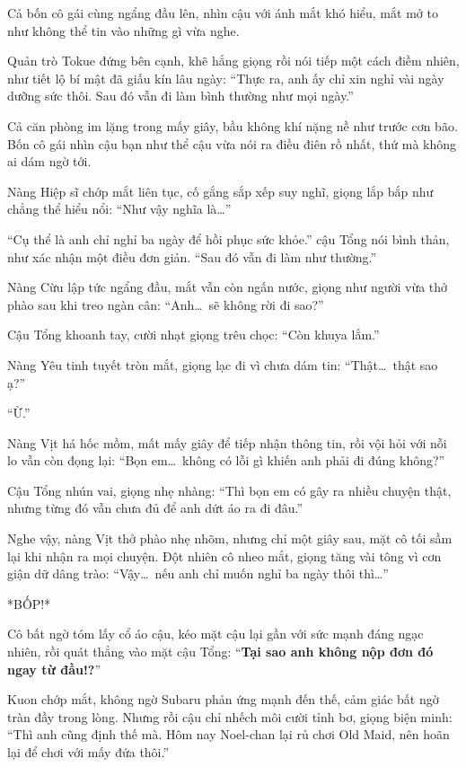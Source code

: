 \documentclass[../main.tex]{subfiles}
\begin{document}
Cả bốn cô gái cùng ngẩng đầu lên, nhìn cậu với ánh mắt khó hiểu, mắt mở to như không thể tin vào những gì vừa nghe.

Quản trò Tokue đứng bên cạnh, khẽ hắng giọng rồi nói tiếp một cách điềm nhiên, như tiết lộ bí mật đã giấu kín lâu ngày: ``Thực ra, anh ấy chỉ xin nghỉ vài ngày dưỡng sức thôi. Sau đó vẫn đi làm bình thường như mọi ngày.''

Cả căn phòng im lặng trong mấy giây, bầu không khí nặng nề như trước cơn bão. Bốn cô gái nhìn cậu bạn như thể cậu vừa nói ra điều điên rồ nhất, thứ mà không ai dám ngờ tới.

Nàng Hiệp sĩ chớp mắt liên tục, cố gắng sắp xếp suy nghĩ, giọng lắp bắp như chẳng thể hiểu nổi: ``Như vậy nghĩa là\dots''

``Cụ thể là anh chỉ nghỉ ba ngày để hồi phục sức khỏe.'' cậu Tổng nói bình thản, như xác nhận một điều đơn giản. ``Sau đó vẫn đi làm như thường.''

Nàng Cừu lập tức ngẩng đầu, mắt vẫn còn ngấn nước, giọng như người vừa thở phào sau khi treo ngàn cân: ``Anh\dots\ sẽ không rời đi sao?''

Cậu Tổng khoanh tay, cười nhạt giọng trêu chọc: ``Còn khuya lắm.''

Nàng Yêu tinh tuyết tròn mắt, giọng lạc đi vì chưa dám tin: ``Thật\dots\ thật sao ạ?''

``Ừ.''

Nàng Vịt há hốc mồm, mất mấy giây để tiếp nhận thông tin, rồi vội hỏi với nỗi lo vẫn còn đọng lại: ``Bọn em\dots\ không có lỗi gì khiến anh phải đi đúng không?''

Cậu Tổng nhún vai, giọng nhẹ nhàng: ``Thì bọn em có gây ra nhiều chuyện thật, nhưng từng đó vẫn chưa đủ để anh dứt áo ra đi đâu.''

Nghe vậy, nàng Vịt thở phào nhẹ nhõm, nhưng chỉ một giây sau, mặt cô tối sầm lại khi nhận ra mọi chuyện. Đột nhiên cô nheo mắt, giọng tăng vài tông vì cơn giận dữ dâng trào: ``Vậy\dots\ nếu anh chỉ muốn nghỉ ba ngày thôi thì\dots''

*BỐP!*

Cô bất ngờ tóm lấy cổ áo cậu, kéo mặt cậu lại gần với sức mạnh đáng ngạc nhiên, rồi quát thẳng vào mặt cậu Tổng: ``\textbf{Tại sao anh không nộp đơn đó ngay từ đầu!?}''

Kuon chớp mắt, không ngờ Subaru phản ứng mạnh đến thế, cảm giác bất ngờ tràn đầy trong lòng. Nhưng rồi cậu chỉ nhếch môi cười tỉnh bơ, giọng biện minh: ``Thì anh cũng định thế mà. Hôm nay Noel-chan lại rủ chơi Old Maid, nên hoãn lại để chơi với mấy đứa thôi.''
\end{document}

